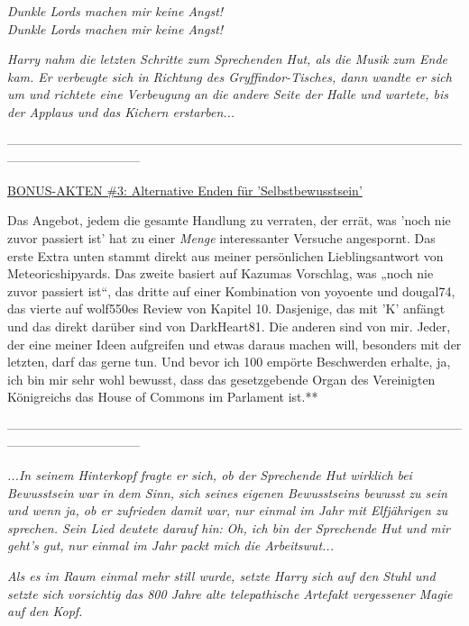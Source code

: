 {\emph{\emph{Dunkle Lords machen mir keine Angst!}\\ \emph{Dunkle Lords machen mir keine Angst!}}

\hfill\break \emph{Harry nahm die letzten Schritte zum Sprechenden Hut, als die Musik zum Ende kam. Er verbeugte sich in Richtung des Gryffindor-Tisches, dann wandte er sich um und richtete eine Verbeugung} \emph{an die} \emph{andere Seite der Halle und wartete, bis der Applaus und das Kichern erstarben...}

--------------------------------------------------------------------------------------------------------------------------------------------

\hfill\break

\uline{BONUS-AKTEN \#3: Alternative Enden für 'Selbstbewusstsein'}

\hfill\break Das Angebot, jedem die gesamte Handlung zu verraten, der errät, was 'noch nie zuvor passiert ist' hat zu einer \emph{Menge} interessanter Versuche angespornt. Das erste Extra unten stammt direkt aus meiner persönlichen Lieblingsantwort von Meteoricshipyards. Das zweite basiert auf Kazumas Vorschlag, was „noch nie zuvor passiert ist“, das dritte auf einer Kombination von yoyoente und dougal74, das vierte auf wolf550es Review von Kapitel 10. Dasjenige, das mit 'K' anfängt und das direkt darüber sind von DarkHeart81. Die anderen sind von mir. Jeder, der eine meiner Ideen aufgreifen und etwas daraus machen will, besonders mit der letzten, darf das gerne tun. Und bevor ich 100 empörte Beschwerden erhalte, ja, ich bin mir sehr wohl bewusst, dass das gesetzgebende Organ des Vereinigten Königreichs das House of Commons im Parlament ist.**

--------------------------------------------------------------------------------------------------------------------------------------------

\hfill\break \emph{...In seinem Hinterkopf} \emph{fragte er sich, ob der Sprechende Hut wirklich} \emph{\emph{bei Bewusstsein}} \emph{war in dem Sinn, sich seines eigenen Bewusstseins bewusst zu sein und wenn ja, ob er zufrieden damit war, nur einmal im Jahr mit Elfjährigen zu sprechen. Sein Lied deutete darauf hin:} \emph{\emph{Oh, ich bin der Sprechende Hut und mir geht}\emph{'}\emph{s gut,}} \emph{\emph{nur}} \emph{\emph{einmal im Jahr}} \emph{\emph{packt mich}} \emph{\emph{die Arbeitswut}\emph{...}}

\emph{Als es im Raum einmal mehr still wurde, setzte Harry sich auf den Stuhl und setzte sich} \emph{\emph{vorsichtig}} \emph{das 800 Jahre alte telepathische Artefakt vergessener Magie auf den Kopf.}

}
